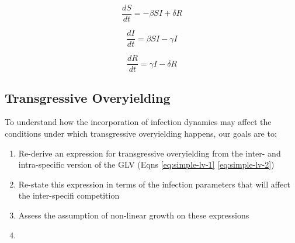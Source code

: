 \documentclass[
  letterpaper,
  DIV=11,
  numbers=noendperiod]{scrartcl}
\providecommand{\tightlist}{%
  \setlength{\itemsep}{0pt}\setlength{\parskip}{0pt}}\usepackage{longtable,booktabs,array}
\begin{document}
\begin{equation}
\label{eq:basic-sir-s}
  \frac{dS}{dt} = - \beta S I + \delta R 
\end{equation}

\begin{equation}
\label{eq:basic-sir-i}
  \frac{dI}{dt} = \beta S I - \gamma I 
\end{equation}

\begin{equation}
\label{eq:basic-sir-r}
  \frac{dR}{dt} = \gamma I - \delta R
\end{equation}

\subsection{Transgressive Overyielding}

To understand how the incorporation of infection dynamics may affect the
conditions under which transgressive overyielding happens, our goals are
to:

\begin{enumerate}
\def\labelenumi{\arabic{enumi})}
\tightlist
\item
  Re-derive an expression for transgressive overyielding from the inter-
  and intra-specific version of the GLV (Eqns \ref{eq:simple-lv-1}
  \ref{eq:simple-lv-2})
\item
  Re-state this expression in terms of the infection parameters that
  will affect the inter-specifi competition
\item
  Assess the assumption of non-linear growth on these expressions
\item
\end{enumerate}
\end{document}
